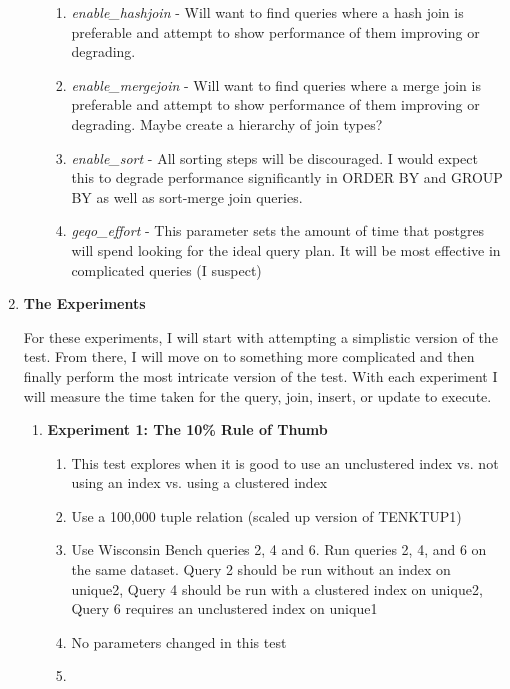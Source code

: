 \documentclass[11pt,letterpaper]{article}
\begin{document}
\begin{enumerate}
\begin{enumerate}{}
	\begin{enumerate}
		\item \textit{enable\_hashjoin} - Will want to find queries where a hash join is preferable and attempt to show performance of them improving or degrading.
		\item \textit{enable\_mergejoin} - Will want to find queries where a merge join is preferable and attempt to show performance of them improving or degrading.  Maybe create a hierarchy of join types?
		\item \textit{enable\_sort } - All sorting steps will be discouraged.  I would expect this to degrade performance significantly in ORDER BY and GROUP BY as well as sort-merge join queries.
		\item \textit{geqo\_effort} - This parameter sets the amount of time that postgres will spend looking for the ideal query plan.  It will be most effective in complicated queries (I suspect)
	\end{enumerate}

\end{enumerate}	

\item \textbf{The Experiments}

For these experiments, I will start with attempting a simplistic version of the test.  From there, I will move on to something more complicated and then finally perform the most intricate version of the test.  With each experiment I will measure the time taken for the query, join, insert, or update to execute.

\begin{enumerate}
	
	\item \textbf{Experiment 1: The 10\% Rule of Thumb}
	\begin{enumerate}
		\item This test explores when it is good to use an unclustered index vs. not using an index vs. using a clustered index
		\item Use a 100,000 tuple relation (scaled up version of TENKTUP1)
		\item Use Wisconsin Bench queries 2, 4 and 6. Run queries 2, 4, and 6 on the same dataset. Query 2 should be run without an index on unique2, Query 4 should be run with a clustered index on unique2, Query 6 requires an unclustered index on unique1
		\item No parameters changed in this test
		\item 
	\end{enumerate}
	 

\end{enumerate}
\end{enumerate}
\end{document}
